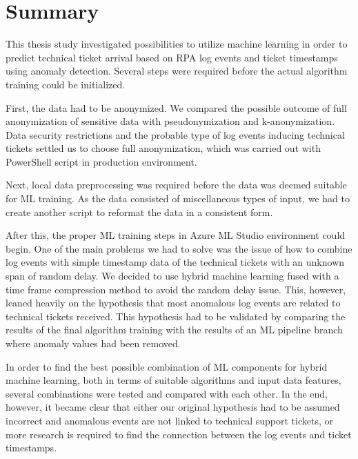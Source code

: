 
\section{Summary}\label{sec:summary}

This thesis study investigated possibilities to utilize machine learning
in order to predict technical ticket arrival
based on RPA log events and ticket timestamps
using anomaly detection.
Several steps were required before the actual algorithm training could be initialized.

First,
the data had to be anonymized.
We compared the possible outcome of full anonymization of sensitive data
with pseudonymization and k-anonymization.
Data security restrictions and the probable type of log events inducing technical tickets
settled us to choose full anonymization,
which was carried out with PowerShell script in production environment.

Next,
local data preprocessing was required
before the data was deemed suitable for ML training.
As the data consisted of miscellaneous types of input,
we had to create another script to reformat the data in a consistent form.

After this,
the proper ML training steps in Azure ML Studio environment could begin.
One of the main problems we had to solve
was the issue of how to combine log events with simple timestamp data of the technical tickets
with an unknown span of random delay.
We decided to use hybrid machine learning
fused with a time frame compression method
to avoid the random delay issue.
This, however,
leaned heavily on the hypothesis that most anomalous log events
are related to technical tickets received.
This hypothesis had to be validated
by comparing the results of the final algorithm training
with the results of an ML pipeline branch where anomaly values had been removed.

In order to find the best possible combination of ML components for hybrid machine learning,
both in terms of suitable algorithms and input data features,
several combinations were tested and compared with each other.
In the end, however,
it became clear that
either our original hypothesis had to be assumed incorrect
and anomalous events are not linked to technical support tickets,
or more research is required to find the connection between the log events and ticket timestamps.




\clearpage